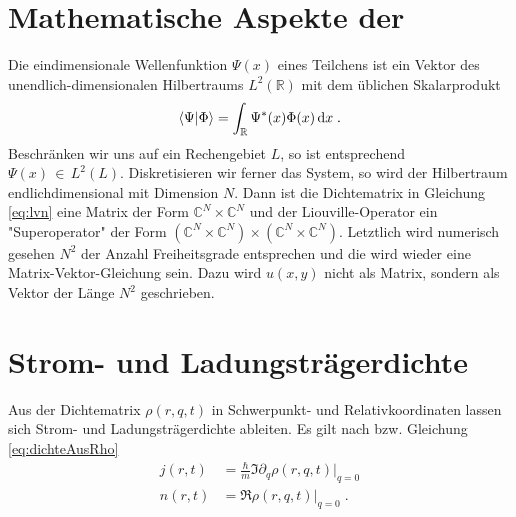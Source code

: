 \section{Mathematische Aspekte der \lvn}
Die eindimensionale Wellenfunktion $\Psi(x)$ eines Teilchens ist ein Vektor des unendlich-dimensionalen Hilbertraums $L^2(\mathbb{R})$ mit dem üblichen Skalarprodukt
\begin{align}
  \bra{\Psi}\ket{\Phi} = \int_{\mathbb{R}} \Psi^*(x)\Phi(x) \mathop{}\!\mathrm{d} x \; .
\end{align}
Beschränken wir uns auf ein Rechengebiet $L$, so ist entsprechend $\Psi(x) \,\in\,L^2(L)$. Diskretisieren wir ferner das System, so wird der Hilbertraum endlichdimensional mit Dimension $N$. Dann ist die Dichtematrix in Gleichung \eqref{eq:lvn} eine Matrix der Form $\mathbb{C}^N \times \mathbb{C}^N$ und der Liouville-Operator ein "Superoperator" \cite{frensley2} der Form $(\mathbb{C}^N \times \mathbb{C}^N)\times(\mathbb{C}^N \times \mathbb{C}^N)$. Letztlich wird numerisch gesehen $N^2$ der Anzahl Freiheitsgrade entsprechen und die \lvn wird wieder eine Matrix-Vektor-Gleichung sein. Dazu wird $u(x,y)$ nicht als Matrix, sondern als Vektor der Länge $N^2$ geschrieben.



\section{Strom- und Ladungsträgerdichte}
Aus der Dichtematrix $\rho(r,q,t)$ in Schwerpunkt- und Relativkoordinaten lassen sich Strom- und Ladungsträgerdichte ableiten. Es gilt nach \cite{lukas1} bzw. Gleichung \eqref{eq:dichteAusRho}
\begin{align}
  j(r,t) &= \frac{\hbar}{m}\Im{\partial_q \rho(r,q,t)|_{q=0}} \\
  n(r,t) &= \Re{\rho(r,q,t)|_{q=0}} \; .
  \label{eq:dichte}
\end{align}



